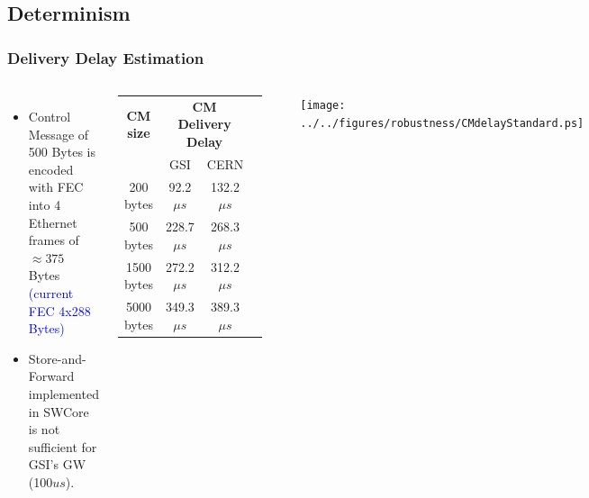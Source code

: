 \documentclass[]{beamer}
\begin{document}
\subsection{Determinism}
\begin{frame}
  \frametitle{Delivery Delay Estimation}   


  \begin{columns}[c]
  \column{2.5in}  %
  \begin{itemize}
  \item Control Message of 500 Bytes is encoded with FEC into 4 Ethernet frames
        of $\approx375$ Bytes \textcolor{blue}{(current FEC 4x288 Bytes)}
  \item Store-and-Forward implemented in SWCore is not sufficient for GSI's GW
        (100$us$).
  \end{itemize}

  {\tiny
  \begin{table}[ht]
  \centering
	  \begin{tabular}{| c | c | c | c |}          \hline
  \textbf{CM size}& \multicolumn{2}{|c|}{\textbf{CM Delivery Delay}}\\
		 &    GSI           & CERN          \\ \hline
  200 bytes      &  92.2$\mu s$    & 132.2$\mu s$    \\ \hline
  500 bytes      & 228.7$\mu s$    & 268.3$\mu s$    \\ \hline
  1500 bytes     & 272.2$\mu s$    & 312.2$\mu s$    \\ \hline
  5000 bytes     & 349.3$\mu s$    & 389.3$\mu s$    \\ \hline
  \end{tabular}
  \label{tab:CMspDelay}
  \end{table}
 }

  \column{3in}

  \texttt{[image: ../../figures/robustness/CMdelayStandard.ps]}

  \end{columns}



\end{frame}
% 
\end{document}
